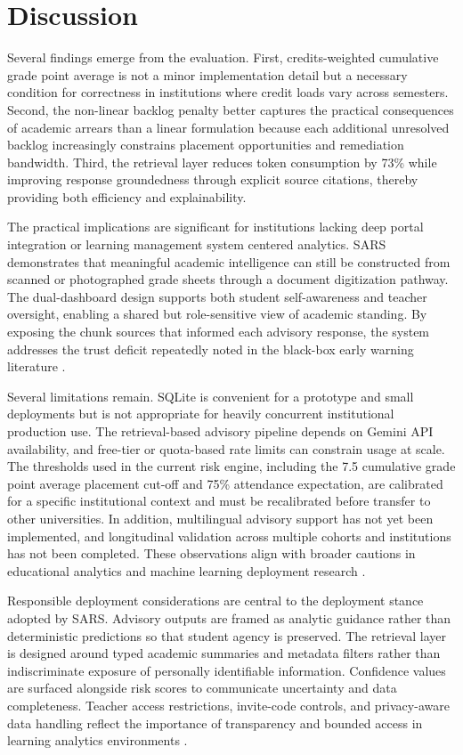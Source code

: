 \documentclass{article}
\begin{document}
\section{Discussion}
Several findings emerge from the evaluation. First, credits-weighted cumulative grade point average is not a minor implementation detail but a necessary condition for correctness in institutions where credit loads vary across semesters. Second, the non-linear backlog penalty better captures the practical consequences of academic arrears than a linear formulation because each additional unresolved backlog increasingly constrains placement opportunities and remediation bandwidth. Third, the retrieval layer reduces token consumption by 73\% while improving response groundedness through explicit source citations, thereby providing both efficiency and explainability.

The practical implications are significant for institutions lacking deep portal integration or learning management system centered analytics. SARS demonstrates that meaningful academic intelligence can still be constructed from scanned or photographed grade sheets through a document digitization pathway. The dual-dashboard design supports both student self-awareness and teacher oversight, enabling a shared but role-sensitive view of academic standing. By exposing the chunk sources that informed each advisory response, the system addresses the trust deficit repeatedly noted in the black-box early warning literature \cite{jayaprakash2014early,khosravi2022xai,conati2018interpretable}.

Several limitations remain. SQLite is convenient for a prototype and small deployments but is not appropriate for heavily concurrent institutional production use. The retrieval-based advisory pipeline depends on Gemini API availability, and free-tier or quota-based rate limits can constrain usage at scale. The thresholds used in the current risk engine, including the 7.5 cumulative grade point average placement cut-off and 75\% attendance expectation, are calibrated for a specific institutional context and must be recalibrated before transfer to other universities. In addition, multilingual advisory support has not yet been implemented, and longitudinal validation across multiple cohorts and institutions has not been completed. These observations align with broader cautions in educational analytics and machine learning deployment research \cite{hussain2019predicting,summers2021predicting}.

Responsible deployment considerations are central to the deployment stance adopted by SARS. Advisory outputs are framed as analytic guidance rather than deterministic predictions so that student agency is preserved. The retrieval layer is designed around typed academic summaries and metadata filters rather than indiscriminate exposure of personally identifiable information. Confidence values are surfaced alongside risk scores to communicate uncertainty and data completeness. Teacher access restrictions, invite-code controls, and privacy-aware data handling reflect the importance of transparency and bounded access in learning analytics environments \cite{ifenthaler2016privacy,khosravi2022xai}.
\end{document}
